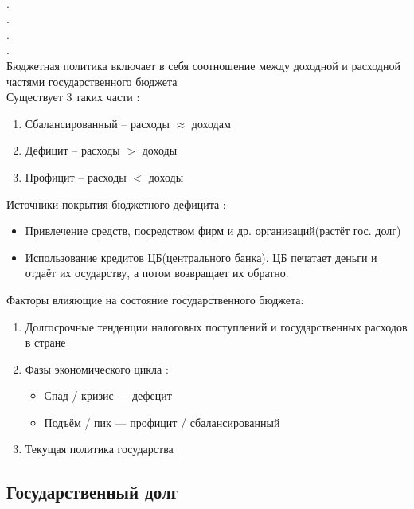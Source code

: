\documentclass[12pt,a4paper]{book}
\begin{document}
\\.\\.\\.\\.\\
Бюджетная политика включает в себя соотношение между доходной и расходной частями государственного бюджета\\
Существует 3 таких части :
\begin{enumerate}
	\item Сбалансированный -- расходы $\approx$  доходам
	\item Дефицит -- расходы $>$ доходы
	\item Профицит -- расходы $<$ доходы
\end{enumerate}

Источники покрытия бюджетного дефицита :
\begin{itemize}
	\item Привлечение средств, посредством фирм и др. организаций(растёт гос. долг) 
	\item Использование кредитов ЦБ(центрального банка). ЦБ печатает деньги и отдаёт их осударству, а потом возвращает их обратно.
	
\end{itemize}
Факторы влияющие на состояние государственного бюджета:
\begin{enumerate}
	\item Долгосрочные тенденции налоговых поступлений и государственных расходов в стране
	\item Фазы экономического цикла : 
	\begin{itemize}
		\item Спад / кризис --- дефецит
		\item Подъём / пик --- профицит / сбалансированный
	\end{itemize}
	\item Текущая политика государства
\end{enumerate}
\subsection{Государственный долг}
\end{document}
